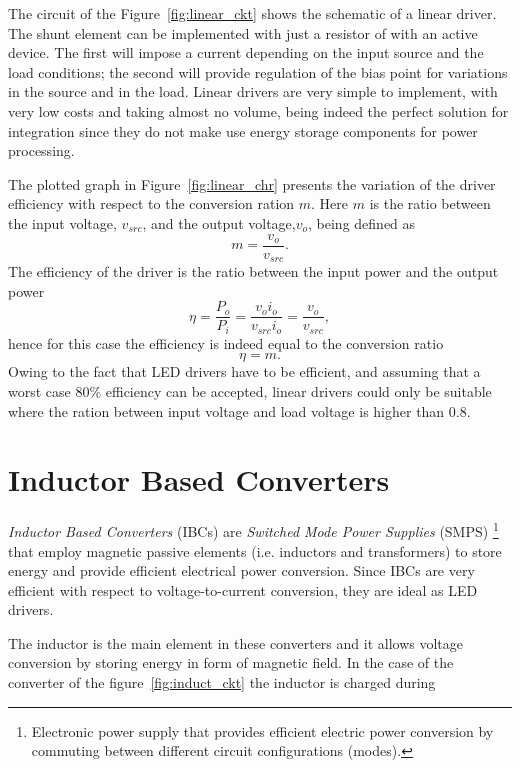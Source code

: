 The circuit of the Figure~\ref{fig:linear_ckt} shows the schematic of a linear driver. The shunt element can be implemented with just a resistor of with an active device. The first will impose a current depending on the input source and the load conditions; the second will provide regulation of the bias point for variations in the source and in the load. Linear drivers are very simple to implement, with very low costs and taking almost no volume, being indeed the perfect solution for integration since they do not make use energy storage components for power processing.

The plotted graph in Figure~\ref{fig:linear_chr} presents the variation of the driver efficiency with respect to the conversion ration $m$. Here $m$  is the ratio between the input voltage, $v_{src}$,  and the output voltage,$v_o$, being defined as
   \begin{equation}
        m = \frac{v_o}{v_{src}}.
   \end{equation}
The efficiency of the driver is the ratio between the input power and the output power
   \begin{equation}
        \eta = \frac{P_o}{P_i} = \frac{v_o i_o}{v_{src} i_o} = \frac{v_o}{v_{src}},
        \label{eq:linear_reg}
   \end{equation}
hence for this case the efficiency is indeed equal to the conversion ratio
   \begin{equation}
        \eta = m.
   \end{equation}
Owing to the fact that LED drivers have to be efficient, and assuming that a worst case 80\% efficiency can be accepted, linear drivers could only be suitable where the ration between input voltage and load voltage is higher than 0.8.


\section{Inductor Based Converters}

\emph{Inductor Based Converters} (IBCs) are \emph{Switched Mode Power Supplies} (SMPS) \footnote{Electronic power supply that provides efficient electric power conversion by commuting between different circuit configurations (modes).}  that employ magnetic passive elements (i.e. inductors and transformers) to store energy and provide efficient electrical power conversion. Since IBCs are very efficient with respect to voltage-to-current conversion, they are ideal as LED drivers.

The inductor is the main element in these converters and it allows voltage conversion by storing energy in form of magnetic field. In the case of the converter of the figure~\ref{fig:induct_ckt} the inductor is charged during

